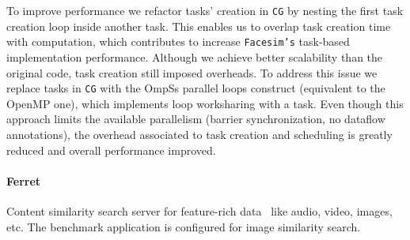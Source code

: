 {%
To improve performance we refactor tasks' creation in \texttt{CG} by nesting the first task creation loop inside another task.
This enables us to overlap task creation time with computation, which contributes to increase \texttt{Facesim's} task-based implementation performance.  
Although we achieve better scalability than the original code, task creation still imposed overheads. To address this issue
we replace tasks in \texttt{CG} with the OmpSs parallel loops construct (equivalent to the OpenMP one), which implements loop worksharing 
with a task. Even though this approach limits the available parallelism (barrier synchronization, no dataflow annotations), the overhead 
associated to task creation and scheduling is greatly reduced and overall performance improved.

\paragraph{\textbf{Ferret}}
Content similarity search server for feature-rich data~\cite{Lv:2006:FTC:1218063.1217966} like audio, video, images, etc.
The benchmark application is configured for image similarity search.  

}
